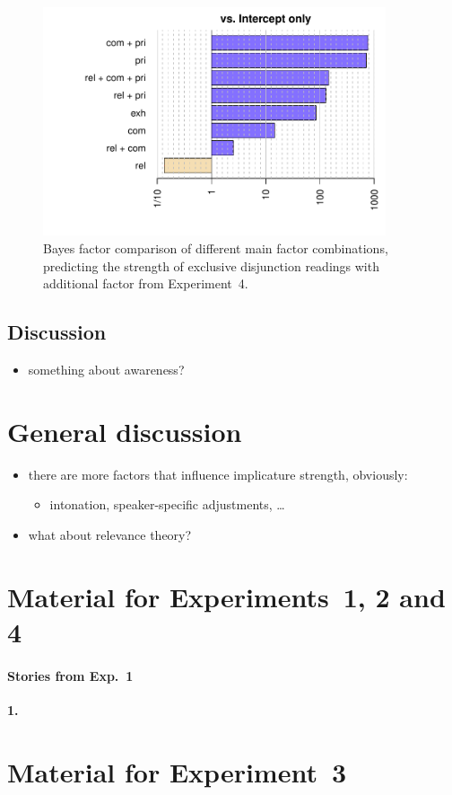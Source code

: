 \documentclass[12pt]{article}
\begin{document}
\begin{figure}
  \centering
  \includegraphics[width=0.9\textwidth]{pics/bfsAllExp4.pdf}
  \caption{Bayes factor comparison of different main factor combinations, predicting the
    strength of exclusive disjunction readings with additional factor \exh from Experiment~4.}
\label{fig:BayesFactorsExp4}
\end{figure}

\subsection{Discussion}

\begin{itemize}
\item something about awareness?
\end{itemize}

\section{General discussion}
\label{sec:general-discussion}

\begin{itemize}
\item there are more factors that influence implicature strength, obviously:
  \begin{itemize}
  \item intonation, speaker-specific adjustments, \dots
  \end{itemize}
\item what about relevance theory?
\end{itemize}

\appendix

\section{Material for Experiments~1, 2 and 4}
\label{sec:mater-exper-1}

\paragraph{Stories from Exp.\ 1}

\textbf{1.} 


\section{Material for Experiment~3}
\label{sec:mater-exper-3}




\end{document}
